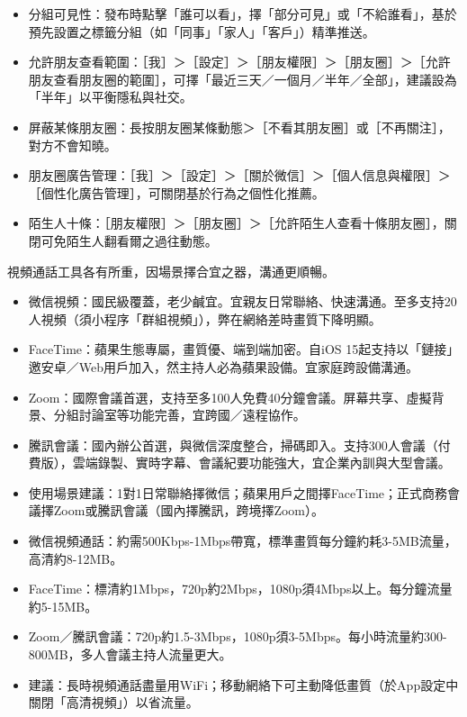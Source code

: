 
\begin{itemize}
  \item 分組可見性：發布時點擊「誰可以看」，擇「部分可見」或「不給誰看」，基於預先設置之標籤分組（如「同事」「家人」「客戶」）精準推送。
  \item 允許朋友查看範圍：［我］＞［設定］＞［朋友權限］＞［朋友圈］＞［允許朋友查看朋友圈的範圍］，可擇「最近三天／一個月／半年／全部」，建議設為「半年」以平衡隱私與社交。
  \item 屏蔽某條朋友圈：長按朋友圈某條動態＞［不看其朋友圈］或［不再關注］，對方不會知曉。
  \item 朋友圈廣告管理：［我］＞［設定］＞［關於微信］＞［個人信息與權限］＞［個性化廣告管理］，可關閉基於行為之個性化推薦。
  \item 陌生人十條：［朋友權限］＞［朋友圈］＞［允許陌生人查看十條朋友圈］，關閉可免陌生人翻看爾之過往動態。
\end{itemize}


視頻通話工具各有所重，因場景擇合宜之器，溝通更順暢。

\begin{itemize}
  \item 微信視頻：國民級覆蓋，老少鹹宜。宜親友日常聯絡、快速溝通。至多支持20人視頻（須小程序「群組視頻」），弊在網絡差時畫質下降明顯。
  \item FaceTime：蘋果生態專屬，畫質優、端到端加密。自iOS 15起支持以「鏈接」邀安卓／Web用戶加入，然主持人必為蘋果設備。宜家庭跨設備溝通。
  \item Zoom：國際會議首選，支持至多100人免費40分鐘會議。屏幕共享、虛擬背景、分組討論室等功能完善，宜跨國／遠程協作。
  \item 騰訊會議：國內辦公首選，與微信深度整合，掃碼即入。支持300人會議（付費版），雲端錄製、實時字幕、會議紀要功能強大，宜企業內訓與大型會議。
  \item 使用場景建議：1對1日常聯絡擇微信；蘋果用戶之間擇FaceTime；正式商務會議擇Zoom或騰訊會議（國內擇騰訊，跨境擇Zoom）。
\end{itemize}


\begin{itemize}
  \item 微信視頻通話：約需500Kbps-1Mbps帶寬，標準畫質每分鐘約耗3-5MB流量，高清約8-12MB。
  \item FaceTime：標清約1Mbps，720p約2Mbps，1080p須4Mbps以上。每分鐘流量約5-15MB。
  \item Zoom／騰訊會議：720p約1.5-3Mbps，1080p須3-5Mbps。每小時流量約300-800MB，多人會議主持人流量更大。
  \item 建議：長時視頻通話盡量用WiFi；移動網絡下可主動降低畫質（於App設定中關閉「高清視頻」）以省流量。
\end{itemize}


